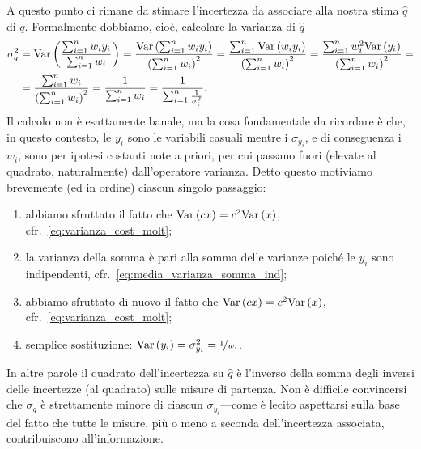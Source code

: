 A questo punto ci rimane da stimare l'incertezza da associare alla nostra stima
$\hat{q}$ di $q$. Formalmente dobbiamo, cioè, calcolare la varianza di
$\hat{q}$
\begin{align}\label{eq:media_pesata_err}
  \sigma^2_q & = \text{Var}\left(\frac{\sum_{i = 1}^{n} w_iy_i}{\sum_{i = 1}^{n}w_i}\right) =
  \frac{\text{Var}\left(\sum_{i = 1}^{n} w_iy_i\right)}{\left(\sum_{i = 1}^{n}w_i\right)^2} =
  \frac{\sum_{i = 1}^{n} \text{Var}\left(w_iy_i\right)}{\left(\sum_{i = 1}^{n}w_i\right)^2} =
  \frac{\sum_{i = 1}^{n} w_i^2\text{Var}\left(y_i\right)}{\left(\sum_{i = 1}^{n}w_i\right)^2} =
  \nonumber\\
  & = \frac{\sum_{i = 1}^{n} w_i}{\left(\sum_{i = 1}^{n}w_i\right)^2} =
  \frac{1}{\sum_{i = 1}^{n} w_i} =
  \frac{1}{\sum_{i = 1}^n \frac{1}{\sigma^2_i}}.
\end{align}
Il calcolo non è esattamente banale, ma la cosa fondamentale da ricordare
è che, in questo contesto, le $y_i$ sono le variabili casuali mentre
i $\sigma_{y_i}$, e di conseguenza i $w_i$, sono per ipotesi costanti note a
priori, per cui passano fuori (elevate al quadrato, naturalmente) dall'operatore
varianza. Detto questo motiviamo brevemente (ed in ordine) ciascun singolo
passaggio:
\begin{enumerate}
\item abbiamo sfruttato il fatto che $\text{Var}\left(cx\right) = c^2 \text{Var}\left(x\right)$,
  cfr.~\eqref{eq:varianza_cost_molt};
\item la varianza della somma è pari alla somma delle varianze
  poiché le $y_i$ sono indipendenti, cfr.~\eqref{eq:media_varianza_somma_ind};
\item abbiamo sfruttato di nuovo il fatto che $\text{Var}\left(cx\right) = c^2 \text{Var}\left(x\right)$,
  cfr.~\eqref{eq:varianza_cost_molt};
\item semplice sostituzione: $\text{Var}\left(y_i\right) = \sigma^2_{y_i} = \nicefrac{1}{w_i}$.
\end{enumerate}
In altre parole il quadrato dell'incertezza su $\hat{q}$ è l'inverso della
somma degli inversi delle incertezze (al quadrato) sulle misure di partenza.
Non è difficile convincersi che $\sigma_q$ è strettamente minore di ciascun
$\sigma_{y_i}$---come è lecito aspettarsi sulla base del fatto che tutte le
misure, più o meno a seconda dell'incertezza associata, contribuiscono
all'informazione.

